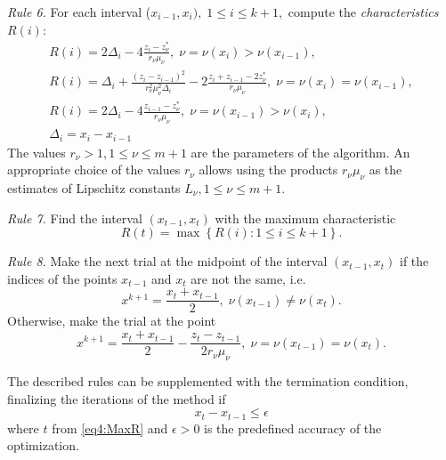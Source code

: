 \emph{Rule 6.} For each interval ($x_{i-1},x_i), \; 1 \leq i \leq k+1,$ compute the \textit{characteristics} $R(i)$:
\begin{gather}
  R(i)=2\Delta_i-4\frac{z_i-z_\nu^\ast}{r_\nu \mu_\nu}, \; \nu=\nu(x_i)>\nu(x_{i-1}), \nonumber \\
  \label{eq4:characteristic}
  R(i)=\Delta_i+\frac{(z_i-z_{i-1})^2}{r_\nu^2 \mu_\nu^2\Delta_i}-2\frac{z_i+z_{i-1}-2z_\nu^\ast}{r_\nu \mu_\nu}, \;  \nu=\nu(x_i)=\nu(x_{i-1}),\\
  R(i)=2\Delta_i-4\frac{z_{i-1}-z_\nu^\ast}{r_\nu \mu_\nu}, \; \nu=\nu(x_{i-1})>\nu(x_i), \nonumber \\
  \Delta_i=x_i - x_{i-1} \nonumber
\end{gather}
The values $r_\nu>1, 1\le\nu\le m+1$ are the parameters of the algorithm. An appropriate choice of the values $r_\nu$ allows using the products $r_\nu\mu_\nu$ as the estimates of Lipschitz constants $L_\nu, 1\le\nu\le m+1$.

\emph{Rule 7.} Find the interval $(x_{t-1},x_t)$ with the maximum characteristic
\begin{equation}
\label{eq4:MaxR}
R(t)=\max{\left\{R(i): 1 \leq i \leq k+1\right\}}.
\end{equation}

\emph{Rule 8.} Make the next trial at the midpoint of the interval
$(x_{t-1},x_t)$ if the indices of the points $x_{t-1}$ and $x_t$  are not the same, i.e.
\[
x^{k+1} = \frac{x_t + x_{t-1}}{2}, \; \nu(x_{t-1}) \neq \nu(x_t).
\]
Otherwise, make the trial at the point
\begin{equation}
\label{eq4:next_point}
x^{k+1} = \frac{x_t+x_{t-1}}{2} - \frac{z_t-z_{t-1}}{2r_\nu\mu_\nu},\; \nu=\nu(x_{t-1})=\nu(x_t).
\end{equation}

The described rules can be supplemented with the termination condition, finalizing the iterations of the method if
\begin{equation}
\label{eq4:stop_cond}
  x_t - x_{t-1}\le\epsilon
\end{equation}
where $t$ from \eqref{eq4:MaxR} and $\epsilon>0$ is the predefined accuracy of the optimization.

